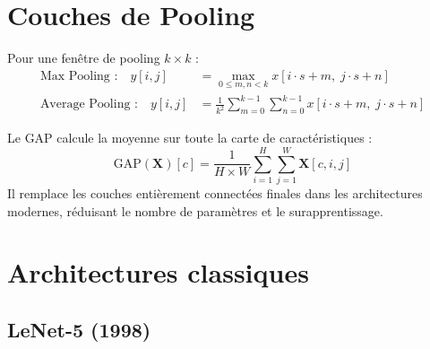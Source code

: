 \section{Couches de Pooling}
\label{sec:pooling}

\begin{formules}[title=\textbf{Op\'erations de pooling}]
Pour une fen\^etre de pooling $k \times k$ :
\begin{align}
\text{Max Pooling :} \quad y[i,j] &= \max_{0 \leq m,n < k} x[i \cdot s + m,\; j \cdot s + n]
\label{eq:maxpool} \\
\text{Average Pooling :} \quad y[i,j] &= \frac{1}{k^2} \sum_{m=0}^{k-1} \sum_{n=0}^{k-1}
  x[i \cdot s + m,\; j \cdot s + n]
\label{eq:avgpool}
\end{align}
\end{formules}

\begin{definition}
Le GAP calcule la moyenne sur toute la carte de caract\'eristiques :
\begin{equation}
\text{GAP}(\mathbf{X})[c] = \frac{1}{H \times W} \sum_{i=1}^{H} \sum_{j=1}^{W}
  \mathbf{X}[c, i, j]
\end{equation}
Il remplace les couches enti\`erement connect\'ees finales dans les architectures
modernes, r\'eduisant le nombre de param\`etres et le surapprentissage.
\end{definition}

\section{Architectures classiques}
\label{sec:classic-archs}

\subsection{LeNet-5 (1998)}

